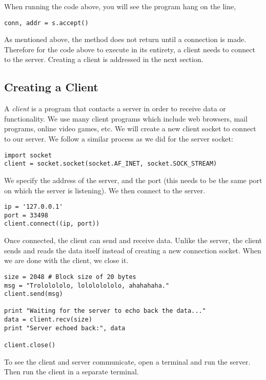 \begin{warn}
When running the code above, you will see the program hang on the line,
\begin{lstlisting}
conn, addr = s.accept()
\end{lstlisting}
As mentioned above, the  method does not return until a connection is made. Therefore for the code above to execute in its entirety, a client needs to connect to the server. Creating a client is addressed in the next section.
\end{warn}

\subsection*{Creating a Client} %

A \emph{client} is a program that contacts a server in order to receive data or functionality. We use many client programs which include web browsers, mail programs, online video games, etc.
We will create a new client socket to connect to our server.
We follow a similar process as we did for the server socket:

\begin{lstlisting}
import socket
client = socket.socket(socket.AF_INET, socket.SOCK_STREAM)
\end{lstlisting}

We specify the address of the server, and the port (this needs to be the same port on which the server is listening).
We then connect to the server.

\begin{lstlisting}
ip = '127.0.0.1'
port = 33498
client.connect((ip, port))
\end{lstlisting}

Once connected, the client can send and receive data.
Unlike the server, the client sends and reads the data itself instead of creating a new connection socket.
When we are done with the client, we close it.

\begin{lstlisting}
size = 2048 # Block size of 20 bytes
msg = "Trololololo, lolololololo, ahahahaha."
client.send(msg)

print "Waiting for the server to echo back the data..."
data = client.recv(size)
print "Server echoed back:", data

client.close()
\end{lstlisting}

To see the client and server communicate, open a terminal and run the server. Then run the client in a separate terminal.

